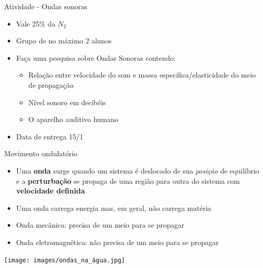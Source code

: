 \begin{frame}{Atividade - Ondas sonoras}
    \begin{itemize}
        \item Vale 25\% da \(N_2\)
        \item Grupo de no máximo 2 alunos
        \item Faça uma pesquisa sobre Ondas Sonoras contendo:
            \begin{itemize}
                \item Relação entre velocidade do som e massa específica/elasticidade do meio de propagação
                \item Nível sonoro em decibéis
                \item O aparelho auditivo humano
            \end{itemize}
        \item Data de entrega 15/1
    \end{itemize}
\end{frame}

\begin{frame}{Movimento ondulatório}
    \begin{itemize}
        \item Uma \textbf{onda} surge quando um sistema é deslocado de sua \textit{posição}
            de equilíbrio e a \textbf{perturbação} se propaga de uma região para outra
            do sistema com \textbf{velocidade definida}
        \item Uma onda carrega energia mas, em geral, não carrega matéria
        \item Onda mecânica: precisa de um meio para se propagar
        \item Onda eletromagnética: não precisa de um meio para se propagar
    \end{itemize}
    \begin{center}
        \texttt{[image: images/ondas\_na\_água.jpg]}
    \end{center}
\end{frame}

